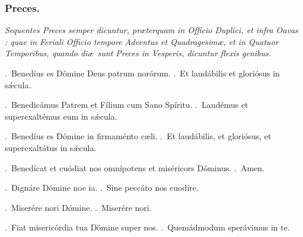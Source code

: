 \documentclass[12pt]{article} %
\def\noinitial{%
\setspaceafterinitial{0pt plus 0em minus 0em}%
\setspacebeforeinitial{0pt plus 0em minus 0em}%
\relax %
}
\newenvironment{rubric}{\color{benred8} \itshape \leftskip 0in \setlength{\parindent}{0.25in}}{\vspace{2 mm}}
\newenvironment{response}{\leftskip 0in \setlength{\parindent}{0in}}{\vspace{2 mm}}
\let\oldVbar\Vbar
\renewcommand{\Vbar}{\textcolor{benred8}{\oldVbar .}}
\let\oldRbar\Rbar
\renewcommand{\Rbar}{\textcolor{benred8}{\oldRbar .}}
\begin{document}
{\noinitial
{}

}

\newpage


\subsubsection*{Preces.}

\begin{rubric}
Sequentes Preces semper dicuntur, pr\ae terquam in Officio Duplici, et infra Oavas : quae in Feriali Officio tempore Adventus et Quadragesim\ae, et in Quatuor Temporibus, quando di\ae\ sunt Preces in Vesperis, dicuntur flexis genibus.

\end{rubric}

\gresetfirstlineaboveinitial{\small \textsc{ \textbf{\textcolor{benred8}{\Vbar}}}}{\small \textsc{ \textbf{\textcolor{benred8}{\Vbar}}}}

\vspace{2mm}

\gresetfirstlineaboveinitial{\small \textsc{ \textbf{\textcolor{benred8}{\Vbar}}}}{\small \textsc{ \textbf{\textcolor{benred8}{\Vbar}}}}

\vspace{2mm}

\gresetfirstlineaboveinitial{\small \textsc{ \textbf{\textcolor{benred8}{\Vbar}}}}{\small \textsc{ \textbf{\textcolor{benred8}{\Vbar}}}}

\begin{response}
\Vbar\ Bened\'{i}us es D\'{o}mine Deus patrum nor\'{o}rum.
\Rbar\ Et laud\'{a}bilis et glori\'{o}sus in s\'{\ae}cula.

\Vbar\ Benedic\'{a}mus Patrem et F\'{i}lium cum Sano Sp\'{i}ritu.
\Rbar\ Laud\'{e}mus et superexalt\'{e}mus eum in s\'{\ae}cula.

\Vbar\ Bened\'{i}us es D\'{o}mine in firmam\'{e}nto c\ae li.
\Rbar\ Et laud\'{a}bilis, et glori\'{o}sus, et superexalt\'{a}tus in s\'{\ae}cula.

\Vbar\ Bened\'{i}cat et cu\'{o}diat nos omn\'{i}potens et mis\'{e}ricors D\'{o}minus.
\Rbar\ Amen.

\Vbar\ Dign\'{a}re D\'{o}mine noe ia.
\Rbar\ Sine pecc\'{a}to nos cuod\'{i}re.

\Vbar\ Miser\'{e}re nori D\'{o}mine.
\Rbar\ Miser\'{e}re nori.

\Vbar\ Fiat miseric\'{o}rdia tua D\'{o}mine super nos. 
\Rbar\ Quem\'{a}dmodum sper\'{a}vimus in te.

\end{response}
\end{document}
